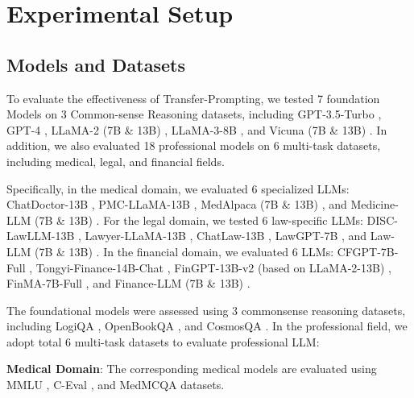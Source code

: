 \section{Experimental Setup}
\label{sec:4}



\subsection{Models and Datasets}

To evaluate the effectiveness of Transfer-Prompting, we tested 7 foundation Models on 3 Common-sense Reasoning datasets, including GPT-3.5-Turbo \citep{chatgpt}, GPT-4 \citep{openai2023gpt4}, LLaMA-2 (7B \& 13B) \citep{touvron2023llama}, LLaMA-3-8B \citep{llama3modelcard}, and Vicuna (7B \& 13B) \citep{zheng2023judging}. In addition, we also evaluated 18 professional models on 6 multi-task datasets, including medical, legal, and financial fields.

Specifically, in the medical domain, we evaluated 6 specialized LLMs: ChatDoctor-13B \citep{li2023chatdoctor}, PMC-LLaMA-13B \citep{wu2023pmcllama}, MedAlpaca (7B \& 13B) \citep{han2023medalpaca}, and Medicine-LLM (7B \& 13B) \citep{cheng2023adapting}. For the legal domain, we tested 6 law-specific LLMs: DISC-LawLLM-13B \citep{yue2023disclawllm}, Lawyer-LLaMA-13B \citep{huang2023lawyer}, ChatLaw-13B \citep{cui2024chatlaw}, LawGPT-7B \citep{zhou2024lawgpt}, and Law-LLM (7B \& 13B) \citep{cheng2023adapting}. In the financial domain, we evaluated 6 LLMs: CFGPT-7B-Full \citep{li2023cfgpt}, Tongyi-Finance-14B-Chat \citep{Tongyi-Finance-14B-Chat}, FinGPT-13B-v2 (based on LLaMA-2-13B) \citep{yang2023fingpt}, FinMA-7B-Full \citep{xie2023pixiu}, and Finance-LLM (7B \& 13B) \citep{cheng2023adapting}.

The foundational models were assessed using 3 commonsense reasoning datasets, including LogiQA \citep{liu2020logiqa}, OpenBookQA \citep{Mihaylov2018CanAS}, and CosmosQA \citep{huang2019cosmos}. In the professional field, we adopt total 6 multi-task datasets to evaluate professional LLM:

\textbf{Medical Domain}: The corresponding medical models are evaluated using MMLU \citep{hendrycks2021measuring}, C-Eval \citep{huang2024c}, and MedMCQA \citep{pmlr-v174-pal22a} datasets.

